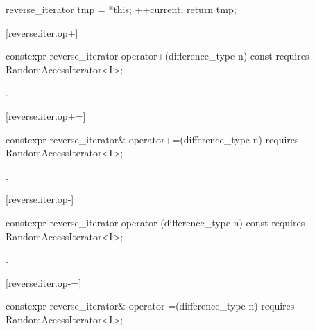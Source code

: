 \begin{itemdescr}
\pnum
\effects
\begin{codeblock}
reverse_iterator tmp = *this;
++current;
return tmp;
\end{codeblock}
\end{itemdescr}

[reverse.iter.op+]{}

%
\begin{itemdecl}
constexpr reverse_iterator
  operator+(difference_type n) const
    requires RandomAccessIterator<I>;
\end{itemdecl}

\begin{itemdescr}
\pnum
\returns
{}.
\end{itemdescr}

[reverse.iter.op+=]{}

%
\begin{itemdecl}
constexpr reverse_iterator&
  operator+=(difference_type n)
    requires RandomAccessIterator<I>;
\end{itemdecl}

\begin{itemdescr}
\pnum
\effects
{}

\pnum
\returns
{}.
\end{itemdescr}

[reverse.iter.op-]{}

%
\begin{itemdecl}
constexpr reverse_iterator
  operator-(difference_type n) const
    requires RandomAccessIterator<I>;
\end{itemdecl}

\begin{itemdescr}
\pnum
\returns
{}.
\end{itemdescr}

[reverse.iter.op-=]{}

%
\begin{itemdecl}
constexpr reverse_iterator&
  operator-=(difference_type n)
    requires RandomAccessIterator<I>;
\end{itemdecl}

